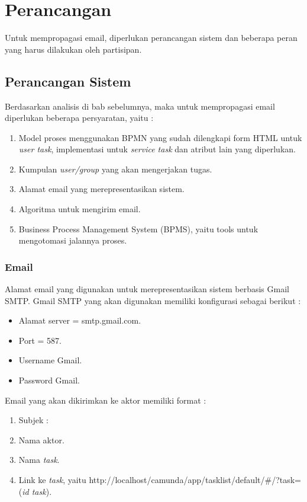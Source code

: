 \chapter{Perancangan}
\label{chap:perancangan}
Untuk mempropagasi email, diperlukan perancangan sistem dan beberapa peran yang harus dilakukan oleh partisipan. 

\section{Perancangan Sistem}
\label{rancangansistem}
Berdasarkan analisis di bab sebelumnya, maka untuk mempropagasi email diperlukan beberapa persyaratan, yaitu :
\begin{enumerate}
	\item Model proses menggunakan BPMN yang sudah dilengkapi form HTML untuk \textit{user task}, implementasi untuk \textit{service task} dan atribut lain yang diperlukan.
	\item Kumpulan \textit{user/group} yang akan mengerjakan tugas.
	\item Alamat email yang merepresentasikan sistem.
	\item Algoritma untuk mengirim email.
	\item Business Process Management System (BPMS), yaitu tools untuk mengotomasi jalannya proses.
\end{enumerate}

\subsection{Email}
\label{email}
Alamat email yang digunakan untuk merepresentasikan sistem berbasis Gmail SMTP. Gmail SMTP yang akan digunakan memiliki konfigurasi sebagai berikut \cite{smtpgoogle} :
\begin{itemize}
	\item Alamat server = smtp.gmail.com.
	\item Port = 587.
	\item Username Gmail.
	\item Password Gmail.
\end{itemize}
Email yang akan dikirimkan ke aktor memiliki format :
\begin{enumerate}
	\item Subjek :
	\item Nama aktor.
	\item Nama \textit{task}.
	\item Link ke \textit{task}, yaitu http://localhost/camunda/app/tasklist/default/\#/?task=(\textit{id task}).
\end{enumerate} 

